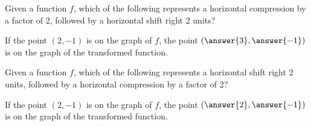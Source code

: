 \documentclass{ximera}
\begin{document}
\begin{exercise}
Given a function $f$, which of the following represents a horizontal compression by a factor of 2, followed by a horizontal shift right 2 units?

\begin{multipleChoice}  
\end{multipleChoice}  

\begin{exercise}
If the point $(2, -1)$ is on the graph of $f$, the point $(\answer{3}, \answer{-1})$ is on the graph of the transformed function.
\end{exercise}
\end{exercise}

\begin{exercise}
Given a function $f$, which of the following represents a horizontal shift right 2 units, followed by a  horizontal compression by a factor of 2?

\begin{multipleChoice}  
\end{multipleChoice}  

\begin{exercise}
If the point $(2, -1)$ is on the graph of $f$, the point $(\answer{2}, \answer{-1})$ is on the graph of the transformed function.
\end{exercise}
\end{exercise}
\end{document}
